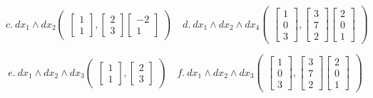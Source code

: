\documentclass[12pt]{article}
\begin{document}
$$
c.\ dx_1\wedge dx_2
\begin{pmatrix}
          \begin{bmatrix}
            1\\1
          \end{bmatrix},
          \begin{bmatrix}
           2\\3
         \end{bmatrix}
         \begin{bmatrix}
           -2\\1
         \end{bmatrix}
    \end{pmatrix}
    \quad
    d.\ dx_1\wedge dx_2\wedge dx_4
    \begin{pmatrix}
          \begin{bmatrix}
            1\\0\\3
          \end{bmatrix},
          \begin{bmatrix}
           3\\7\\2
         \end{bmatrix}
          \begin{bmatrix}
           2\\0\\1
         \end{bmatrix}
    \end{pmatrix}
$$

$$
e.\ dx_1\wedge dx_2\wedge dx_3
\begin{pmatrix}
          \begin{bmatrix}
            1\\1
          \end{bmatrix},
          \begin{bmatrix}
           2\\3
         \end{bmatrix}
    \end{pmatrix}
    \quad
    f.\ dx_1\wedge dx_2\wedge dx_3
    \begin{pmatrix}
        \begin{bmatrix}
            1\\0\\3
          \end{bmatrix},
          \begin{bmatrix}
           3\\7\\2
         \end{bmatrix}
          \begin{bmatrix}
           2\\0\\1
         \end{bmatrix}
    \end{pmatrix}
$$
\medskip
\end{document}
